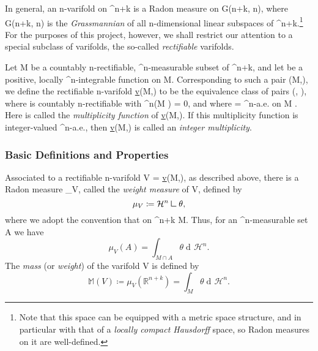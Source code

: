 \documentclass[a4paper, 11pt]{article}
\theoremstyle{plain}
\theoremstyle{definition}
\theoremstyle{remark}
\DeclareMathOperator{\diff}{d \!}
\newcommand{\mres}{\mathrel{\vrule height 1.6ex depth 0pt width 0.13ex\vrule height 0.13ex depth 0pt width 1.3ex}} %
\numberwithin{equation}{subsection}
\def\({}
\def\){}
\begin{document}
In general, an \(n\)-varifold on \(\Omega \subset {}^{n+k}\) is a Radon measure on \(\Omega \times G(n+k, n)\), where \(G(n+k, n)\) is the \emph{Grassmannian} of all \(n\)-dimensional linear subspaces of \(^{n+k}\).\footnote{Note that this space can be equipped with a metric space structure, and in particular with that of a \emph{locally compact Hausdorff} space, so Radon measures on it are well-defined.} For the purposes of this project, however, we shall restrict our attention to a special subclass of varifolds, the so-called \emph{rectifiable} varifolds.

Let \(M\) be a countably \(n\)-rectifiable, \(^{n}\)-measurable subset of \(^{n+k}\), and let \(\theta\) be a positive, locally \(^{n}\)-integrable function on \(M\). Corresponding to such a pair \((M,\theta)\), we define the rectifiable \(n\)-varifold \(\underline{v}(M,\theta)\) to be the equivalence class of pairs \((, \tilde{\theta})\), where \(\) is countably \(n\)-rectifiable with \(^{n}(M \triangle {}) = 0\), and where \(\theta = \tilde{\theta}\) \(^{n}\)-a.e. on \(M \cap {}\). Here \(\theta\) is called the \emph{multiplicity function} of \(\underline{v}(M,\theta)\). If this multiplicity function is integer-valued \(^{n}\)-a.e., then \(\underline{v}(M,\theta)\) is called an \emph{integer multiplicity}.

\subsubsection{Basic Definitions and Properties}

Associated to a rectifiable \(n\)-varifold \(V = \underline{v}(M,\theta)\), as described above, there is a Radon measure \(\mu_V\), called the \emph{weight measure} of \(V\), defined by
\begin{equation}
\mu_V \coloneq \mathcal{H}^{n} \mres \theta,
\end{equation}
where we adopt the convention that \(\theta {}\) on \(^{n+k} \setminus M\). Thus, for an \(^{n}\)-measurable set \(A\) we have
\begin{equation}
\mu_V(A) = \int_{M \cap A} \theta \diff \mathcal{H}^{n}.
\end{equation}
The \emph{mass} (or \emph{weight}) of the varifold \(V\) is defined by
\begin{equation}
\mathbb{M}(V) \coloneq \mu_V(\mathbb{R}^{n+k}) = \int_{M} \theta \diff \mathcal{H}^{n}.
\end{equation}
\end{document}
